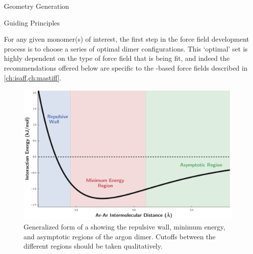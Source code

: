 
\begin{section}{Geometry Generation}
\label{sec:workflow-geometries}


\begin{subsection}{Guiding Principles}


For any given monomer(s) of interest, the first step in the force field
development process is to choose a series of optimal dimer
configurations. This `optimal' set is highly dependent on the type of force field that
is being fit, and indeed the recommendations offered below are specific to the
\sapt-based force fields described in \cref{ch:isaff,ch:mastiff}.

\begin{figure}
\centering
\includegraphics[width=1.0\textwidth]{workflow/generalized_pes.pdf}
\caption[Generalized form of a \pes showing the repulsive wall, minimum
energy, and asymptotic regions.]
        {Generalized form of a \pes showing the repulsive wall, minimum
energy, and asymptotic regions of the argon dimer. Cutoffs between the
different regions should be taken qualitatively.}
\label{fig:workflow-pes}
\end{figure}


\end{subsection}
\end{section}

